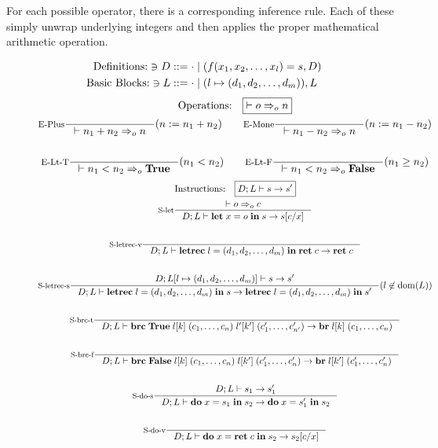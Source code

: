 \documentclass[a4paper, oneside, 10pt, final]{memoir}
\begin{document}
For each possible operator, there is a corresponding inference
rule. Each of these simply unwrap underlying integers and then applies
the proper mathematical arithmetic operation.
\newcommand{\meval}{:=}
\begin{figure}
  \begin{align*}
    \text{Definitions:} \ni D & ::= \cdot \; \vert \; (f(x_1, x_2, \dotsc,
    x_l) = s, D)\\
    \text{Basic Blocks:} \ni L & ::= \cdot \; \vert \; (l \mapsto (d_1, d_2, \dotsc, d_m)),L
  \end{align*}
  \begin{gather*}
    \text{Operations:} \quad \boxed{|- o \eop n}\\
    \inference[E-Plus]{}{|- n_1 + n_2 \eop n}(n \meval n_1 + n_2)
    \quad \quad
    \inference[E-Mone]{}{|- n_1 - n_2 \eop n}(n \meval n_1 - n_2)\\\\
    \inference[E-Lt-T]{}{|- n_1  < n_2 \eop \btrue}(n_1 < n_2) \quad \quad
    \inference[E-Lt-F]{}{|- n_1  < n_2 \eop \bfalse}(n_1 \geq n_2)
  \end{gather*}
  \begin{gather*}
    \text{Instructions:} \quad \boxed{D;L |- s -> s'}\\
    \inference[S-let]{|- o \eop c}{D;L |- \ilet{x}{o}{s} -> s[c/x]}\\\\
    \inference[S-letrec-v]{}{D;L |- \iletrec{l}{\dbundle}
      {\iret{c}} -> \iret{c}}\\\\
    \inference[S-letrec-s]{D;L[l \mapsto \dbundle] |- s -> s'}
    {D;L |- \iletrec{l}{\dbundle}{s} -> \iletrec{l}{\dbundle}{s'}}(l \not \in \dom{L})\\\\
    \inference[S-brc-t]{}{D;L |-
      \ibrc{\btrue}{\lbl{k}}{(c_1, \dotsc, c_n)}{\lblp{k'}}{(c'_1, \dotsc,
        c'_{n'})} -> \ibr{\lbl{k}}{(c_1, \dotsc, c_n)}}\\\\
    \inference[S-brc-f]{}{D;L |-
      \ibrc{\bfalse}{\lbl{k}}{(c_1, \dotsc, c_n)}{\lbl{{k'}}}{(c'_1, \dotsc, c'_n)} ->
      \ibr{\lbl{{k'}}}{(c'_1, \dotsc, c'_n)}}\\\\
    \inference[S-do-s]{D;L |- s_1 -> s'_1}{D;L |-
      \ido{x}{s_1}{s_2} -> \ido{x}{s'_1}{s_2}}\\\\
    \inference[S-do-v]{}{D;L |- \ido{x}{\iret{c}}{s_2} -> s_2[c/x]}\\\\

\end{gather*}
\end{figure}
\end{document}
